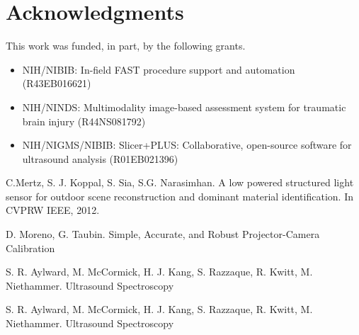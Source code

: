 \documentclass{llncs}
\begin{document}
\section*{Acknowledgments}
This work was funded, in part, by the following grants.
\begin{itemize}
	\item NIH/NIBIB: In-field FAST procedure support and automation (R43EB016621)
	\item NIH/NINDS: Multimodality image-based assessment system for traumatic brain injury (R44NS081792)
	\item NIH/NIGMS/NIBIB: Slicer+PLUS: Collaborative, open-source software for ultrasound analysis (R01EB021396)
\end{itemize}

%
%
\begin{thebibliography}{}
%
C.Mertz, S. J. Koppal, S. Sia, S.G. Narasimhan. A low powered structured light sensor for outdoor scene reconstruction and dominant material identification. In CVPRW IEEE, 2012.

D. Moreno, G. Taubin. Simple, Accurate, and Robust Projector-Camera Calibration

S. R. Aylward, M. McCormick, H. J. Kang, S. Razzaque, R. Kwitt, M. Niethammer. Ultrasound Spectroscopy

S. R. Aylward, M. McCormick, H. J. Kang, S. Razzaque, R. Kwitt, M. Niethammer. Ultrasound Spectroscopy

\end{thebibliography}
\end{document}
